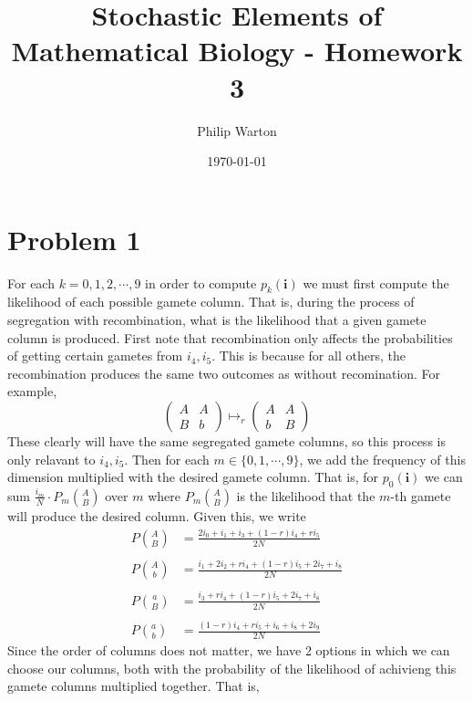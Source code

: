 \documentclass{article}
\theoremstyle{definition}
\begin{document}
\title{Stochastic Elements of Mathematical Biology - Homework 3}
\author{Philip Warton}
\date{\today}
\maketitle
\section*{Problem 1}
For each $k=0,1,2,\cdots,9$ in order to compute $p_k(\bm i)$ we must first compute the likelihood of each 
possible gamete column. That is, during the process of segregation with recombination, what is the likelihood that 
a given gamete column is produced. First note that recombination only affects the probabilities of getting certain gametes 
from $i_4, i_5$. This is because for all others, the recombination produces the same two outcomes as without recomination.
For example,
\[
    \begin{pmatrix}
        A&A\\B&b
    \end{pmatrix} \mapsto_{r} \begin{pmatrix}
        A & A \\
        b & B
    \end{pmatrix}
\]
These clearly will have the same segregated gamete columns, so this process is only relavant to $i_4,i_5$.
Then for each $m \in \{0,1,\cdots,9\}$, we add the frequency of this dimension multiplied with the desired gamete column.
That is, for $p_0(\bm i)$ we can sum $\frac{i_m}{N} \cdot P_m{A \choose B}$ over $m$ where $P_m{A \choose B}$ is the likelihood
that the $m$-th gamete will produce the desired column. Given this, we write
\begin{align*}
    P{A \choose B} &= \frac{2i_0 + i_1 + i_3 + (1-r)i_4 + ri_5}{2N}\\\\
    P{A \choose b} &= \frac{i_1 + 2i_2 + ri_4 + (1-r)i_5 + 2i_7 + i_8}{2N}\\\\
    P{a \choose B} &= \frac{i_3 + ri_4 + (1-r)i_5 + 2i_7 + i_8}{2N}\\\\
    P{a \choose b} &= \frac{(1-r)i_4 + ri_5 + i_6 + i_8 + 2i_9}{2N}
\end{align*}
Since the order of columns does not matter, we have 2 options in which we can choose our columns, both with the probability 
of the likelihood of achivieng this gamete columns multiplied together. That is,
\end{document}

